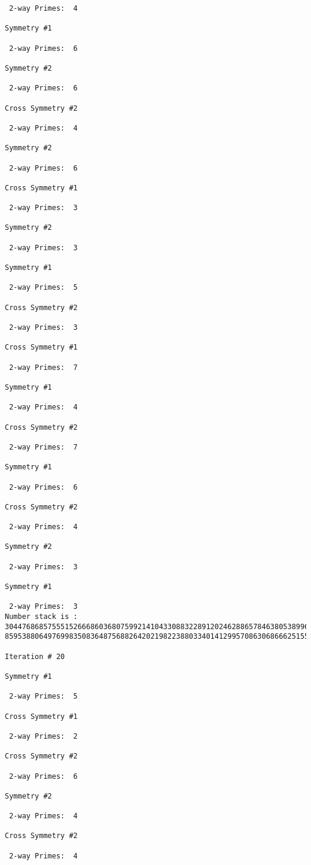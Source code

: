 \begin{verbatim}
 2-way Primes: 	4

Symmetry #1

 2-way Primes: 	6

Symmetry #2

 2-way Primes: 	6

Cross Symmetry #2

 2-way Primes: 	4

Symmetry #2

 2-way Primes: 	6

Cross Symmetry #1

 2-way Primes: 	3

Symmetry #2

 2-way Primes: 	3

Symmetry #1

 2-way Primes: 	5

Cross Symmetry #2

 2-way Primes: 	3

Cross Symmetry #1

 2-way Primes: 	7

Symmetry #1

 2-way Primes: 	4

Cross Symmetry #2

 2-way Primes: 	7

Symmetry #1

 2-way Primes: 	6

Cross Symmetry #2

 2-way Primes: 	4

Symmetry #2

 2-way Primes: 	3

Symmetry #1

 2-way Primes: 	3
Number stack is :
30447686857555152666860368075992141043308832289120246288657846380538996794608835958544046240163340857
85953880649769983508364875688264202198223880334014129957086306866625155575868674403758043361042640445

Iteration #	20

Symmetry #1

 2-way Primes: 	5

Cross Symmetry #1

 2-way Primes: 	2

Cross Symmetry #2

 2-way Primes: 	6

Symmetry #2

 2-way Primes: 	4

Cross Symmetry #2

 2-way Primes: 	4


\end{verbatim}

